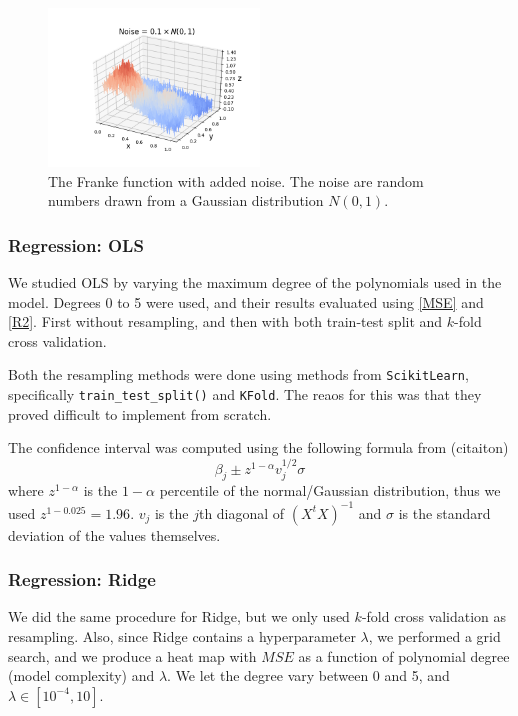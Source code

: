 \documentclass[reprint,english,notitlepage]{revtex4-1}  %
\begin{document}
\begin{figure}[h]
    \centering
    \includegraphics[width=0.50\textwidth]{original_noise.png}
    \caption{The Franke function with added noise. The noise are random numbers drawn from a Gaussian distribution $N(0,1)$.}
    \label{franke: nosie}
\end{figure}

\subsubsection{Regression: OLS}
We studied OLS by varying the maximum degree of the polynomials used in the model. Degrees 0 to 5 were used, and their results evaluated using \ref{MSE} and \ref{R2}. First without resampling, and then with both train-test split and $k$-fold cross validation.

Both the resampling methods were done using methods from \texttt{ScikitLearn}, specifically \texttt{train\_test\_split()} and \texttt{KFold}. The reaos for this was that they proved difficult to implement from scratch.

The confidence interval was computed using the following formula from (citaiton)
\begin{equation}
	\beta_j \pm z^{1 - \alpha}v_j^{1/2}\sigma
\end{equation}
where $z^{1 - \alpha}$ is the $1 - \alpha$ percentile of the normal/Gaussian distribution, thus we used $z^{1 - 0.025} = 1.96$. $v_j$ is the $j$th diagonal of $(X^tX)^{-1}$ and $\sigma$ is the standard deviation of the values themselves.

\subsubsection{Regression: Ridge}
We did the same procedure for Ridge, but we only used $k$-fold cross validation as resampling. Also, since Ridge contains a hyperparameter $\lambda$, we performed a grid search, and we produce a heat map with $MSE$ as a function of polynomial degree (model complexity) and $\lambda$. We let the degree vary between 0 and 5, and $\lambda \in [10^{-4}, 10]$.
\end{document}
